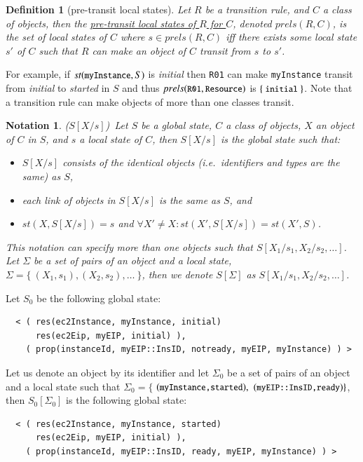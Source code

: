 \documentclass[12pt]{report}
\newtheorem{notation}{Notation}
\newtheorem{definition}{Definition}
\newcommand{\mbstt}[1]{\mbox{\small{\tt {#1}}}}
\newcommand{\stt}[1]{{\small{\tt {#1}}}}
\newcommand{\ul}{\underline}
\begin{document}
\begin{definition}[pre-transit local states]
Let $R$ be a transition rule, and $C$ a class of objects, then
the \ul{pre-transit local states of $R$ for $C$}, denoted
\ul{$prels(R,C)$}, is the set of local states of $C$ where $s \in
prels(R,C)$ iff there exists some local state $s'$ of $C$ such that
$R$ can make an object of $C$ transit from $s$ to $s'$.
\end{definition}
For example, if $st(\mbstt{myInstance},S)$ is {\it initial} then
\stt{R01} can make \stt{myInstance} transit from {\it initial} to {\it
  started} in $S$ and thus $prels(\mbstt{R01},\mbstt{Resource})$ is
$\{~\mbstt{initial}~\}$. Note that a transition rule can make objects
of more than one classes transit.

\begin{notation}($S[X/s]$)\
Let $S$ be a global state, $C$ a class of objects, $X$ an object
of $C$ in $S$\!, and $s$ a local state of $C$, then
\ul{$S[X/s]$} is the global state such that:
\begin{itemize}
\item $S[X/s]$ consists of the identical objects (i.e.\ identifiers and
  types are the same) as $S$\!,
\item each link of objects in $S[X/s]$ is the same as $S$\!, and
\item $st(X,S[X/s])=s$ and $\forall X'\ne X:st(X',S[X/s])=st(X',S)$.
\end{itemize}
This notation can specify more than one objects such that
\ul{$S[X_1/s_1,X_2/s_2,\dots]$}.  Let $\Sigma$ be a set of pairs of
an object and a local state, $\Sigma = \{~ (X_1,s_1), (X_2,s_2), \dots~\}$,
then we denote \ul{$S[\Sigma]$} as $S[X_1/s_1,X_2/s_2,\dots]$.
\end{notation}
Let $\mathit{S_0}$ be the following global state:
\small
\begin{verbatim}
  < ( res(ec2Instance, myInstance, initial)
      res(ec2Eip, myEIP, initial) ),
    ( prop(instanceId, myEIP::InsID, notready, myEIP, myInstance) ) >
\end{verbatim}
\normalsize
Let us denote an object by its identifier and let $\Sigma_0$ be a set
of pairs of an object and a local state such that $\Sigma_0=\{$
$(\mbstt{myInstance,started}),$ $(\mbstt{myEIP::InsID,ready})\}$, then
$\mathit{S_0}[\Sigma_0]$ is the following global state:
\small
\begin{verbatim}
  < ( res(ec2Instance, myInstance, started)
      res(ec2Eip, myEIP, initial) ),
    ( prop(instanceId, myEIP::InsID, ready, myEIP, myInstance) ) >
\end{verbatim}
\normalsize
\end{document}
